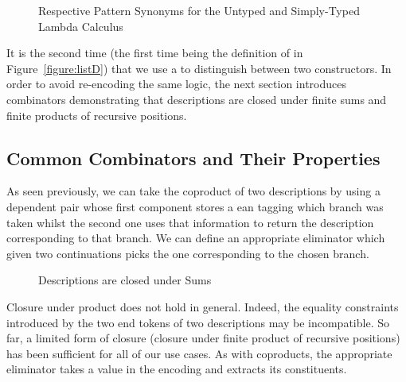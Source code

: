 \begin{figure}[h]
\begin{minipage}{0.40\textwidth}
\end{minipage}\hspace{2em}
\begin{minipage}{0.50\textwidth}
\end{minipage}
\caption{Respective Pattern Synonyms for the Untyped and Simply-Typed Lambda Calculus}
\end{figure}

It is the second time (the first time being the definition of
 in Figure~\ref{figure:listD}) that we use a
 to distinguish between two constructors. In order
to avoid re-encoding the same logic,
the next section introduces combinators demonstrating that
descriptions are closed under finite sums and finite products
of recursive positions.

\subsection{Common Combinators and Their Properties}\label{desccomb}

As seen previously, we can take the coproduct  of two
descriptions by using a dependent pair whose first component
stores a ean tagging which branch was taken whilst
the second one uses that information to return the description
corresponding to that branch. We can define an appropriate
eliminator  which given two continuations picks the
one corresponding to the chosen branch.

\begin{figure}[h]
\begin{minipage}{0.45\textwidth}
\end{minipage}\hspace{2em}
\begin{minipage}{0.45\textwidth}
\end{minipage}
\caption{Descriptions are closed under Sums}
\end{figure}

Closure under product does not hold in general. Indeed, the
equality constraints introduced by the two end tokens of two
descriptions may be incompatible. So far, a limited form of
closure (closure under finite product of recursive positions)
has been sufficient for all of our use cases. As with coproducts,
the appropriate eliminator  takes a value in the encoding
and extracts its constituents.

